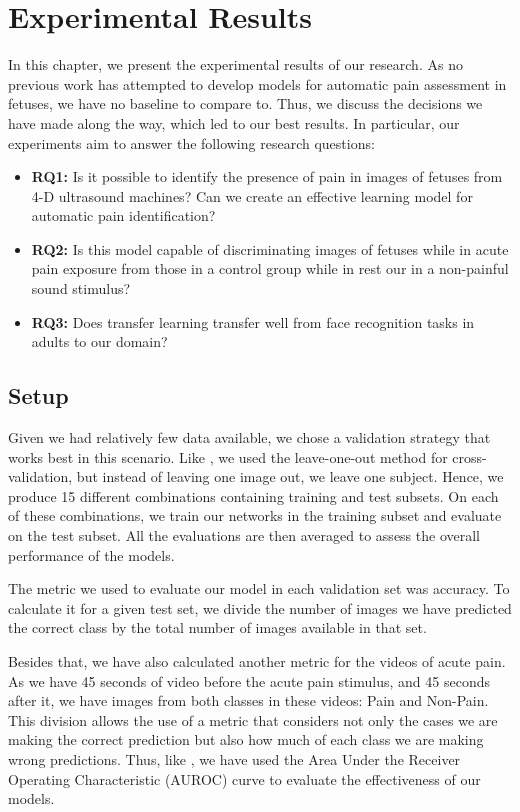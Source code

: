 \chapter{Experimental Results}

In this chapter, we present the experimental results of our research. As no previous work has attempted to develop models for automatic pain assessment in fetuses, we have no baseline to compare to. Thus, we discuss the decisions we have made along the way, which led to our best results. In particular, our experiments aim to answer the following research questions:

\begin{itemize}
    \item \textbf{RQ1:} Is it possible to identify the presence of pain in images of fetuses from 4-D ultrasound machines? Can we create an effective learning model for automatic pain identification?
    
    \item \textbf{RQ2:} Is this model capable of discriminating images of fetuses while in acute pain exposure from those in a control group while in rest our in a non-painful sound stimulus?
    
    \item \textbf{RQ3:} Does transfer learning transfer well from face recognition tasks in adults to our domain?
\end{itemize}

\section{Setup}

Given we had relatively few data available, we chose a validation strategy that works best in this scenario. Like \cite{CelonaM17}, we used the leave-one-out method for cross-validation, but instead of leaving one image out, we leave one subject. Hence, we produce 15 different combinations containing training and test subsets. On each of these combinations, we train our networks in the training subset and evaluate on the test subset. All the evaluations are then averaged to assess the overall performance of the models.

The metric we used to evaluate our model in each validation set was accuracy. To calculate it for a given test set, we divide the number of images we have predicted the correct class by the total number of images available in that set.

Besides that, we have also calculated another metric for the videos of acute pain. As we have 45 seconds of video before the acute pain stimulus, and 45 seconds after it, we have images from both classes in these videos: Pain and Non-Pain.  This division allows the use of a metric that considers not only the cases we are making the correct prediction but also how much of each class we are making wrong predictions. Thus, like \cite{abs-1807-01631}, we have used the Area Under the Receiver Operating Characteristic (AUROC) curve to evaluate the effectiveness of our models.

